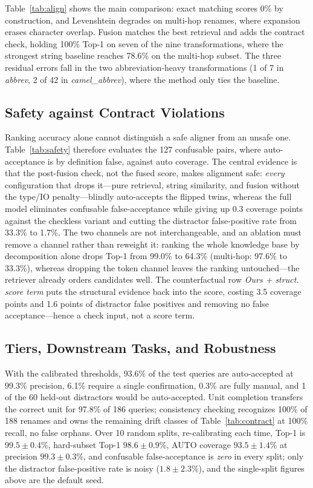 \documentclass[conference]{IEEEtran}
\begin{document}
Table~\ref{tab:align} shows the main comparison: exact matching scores 0\% by
construction, and Levenshtein degrades on multi-hop renames, where expansion
erases character overlap. Fusion matches the best retrieval and adds the
contract check, holding 100\% Top-1 on seven of the nine transformations,
where the strongest string baseline reaches 78.6\% on the multi-hop subset.
The three residual errors fall in the two abbreviation-heavy transformations
(1 of 7 in \emph{abbrev}, 2 of 42 in \emph{camel\_abbrev}), where the method
only ties the baseline.

\subsection{Safety against Contract Violations}
\label{sec:safety}


Ranking accuracy alone cannot distinguish a safe aligner from an unsafe one.
Table~\ref{tab:safety} therefore evaluates the 127 confusable pairs, where
auto-acceptance is by definition false, against auto coverage. The central
evidence is that the post-fusion check, not the fused score, makes alignment
safe: \emph{every} configuration that drops it---pure retrieval, string
similarity, and fusion without the type/IO penalty---blindly auto-accepts the
flipped twins, whereas the full model eliminates confusable false-acceptance
while giving up 0.3 coverage points against the checkless variant and cutting
the distractor false-positive rate from 33.3\% to 1.7\%. The two channels are
not interchangeable, and an ablation must remove a channel rather than reweight
it: ranking the whole knowledge base by decomposition alone drops Top-1 from
99.0\% to 64.3\% (multi-hop: 97.6\% to 33.3\%), whereas dropping the token
channel leaves the ranking untouched---the retriever already orders candidates
well. The counterfactual row \emph{Ours + struct. score term} puts the
structural evidence back into the score, costing 3.5 coverage points and 1.6
points of distractor false positives and removing no false acceptance---hence
a check input, not a score term.


\subsection{Tiers, Downstream Tasks, and Robustness}
\label{sec:tiers}
With the calibrated thresholds, 93.6\% of the test queries are auto-accepted at
99.3\% precision, 6.1\% require a single confirmation, 0.3\% are fully manual,
and 1 of the 60 held-out distractors would be auto-accepted. Unit completion
transfers the correct unit for 97.8\% of 186 queries; consistency checking
recognizes 100\% of 188 renames and owns the remaining drift classes of
Table~\ref{tab:contract} at 100\% recall, no false orphans. Over 10 random
splits, re-calibrating each time, Top-1 is $99.5{\pm}0.4\%$, hard-subset Top-1
$98.6{\pm}0.9\%$, AUTO coverage $93.5{\pm}1.4\%$ at precision
$99.3{\pm}0.3\%$, and confusable false-acceptance is \emph{zero} in every
split; only the distractor false-positive rate is noisy ($1.8{\pm}2.3\%$), and
the single-split figures above are the default seed.
\end{document}
